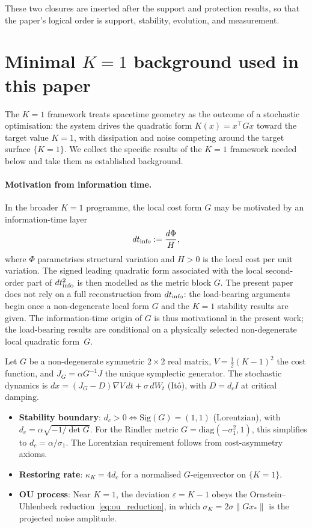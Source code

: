 \documentclass[11pt,a4paper]{article}
\theoremstyle{definition}
\begin{document}
\medskip\noindent
These two closures are inserted after the support and protection results,
so that the paper's logical order is support, stability, evolution, and
measurement.

\section{Minimal $K{=}1$ background used in this paper}\label{sec:review}

The $K{=}1$ framework treats spacetime geometry as the outcome of a stochastic optimisation: the system drives the quadratic form $K(x) = x^\top G x$ toward the target value $K = 1$, with dissipation and noise competing around the target surface $\{K{=}1\}$. We collect the specific results of the $K{=}1$ framework needed below and take them as established background.

\paragraph{Motivation from information time.}
In the broader $K{=}1$ programme, the local cost form $G$ may be
motivated by an information-time layer
\[
dt_{\rm info}:=\frac{d\Phi}{H},
\]
where $\Phi$ parametrises structural variation and $H>0$ is the
local cost per unit variation. The signed leading quadratic form
associated with the local second-order part of $dt_{\rm info}^2$ is
then modelled as the metric block $G$. The present paper does not rely
on a full reconstruction from $dt_{\rm info}$: the load-bearing
arguments begin once a non-degenerate local form $G$ and the
$K{=}1$ stability results are given. The information-time origin of $G$
is thus motivational in the present work; the load-bearing results are
conditional on a physically selected non-degenerate local quadratic
form~$G$.

Let $G$ be a non-degenerate symmetric $2\times 2$ real matrix, $V = \tfrac{1}{2}(K-1)^2$ the cost function, and $J_G = \alpha G^{-1}J$ the unique symplectic generator. The stochastic dynamics is $dx = (J_G - D)\nabla V\,dt + \sigma\,dW_t$ (It\^o), with $D = d_c I$ at critical damping.

\begin{itemize}
\item \textbf{Stability boundary}: $d_c > 0 \Leftrightarrow \mathrm{Sig}(G) = (1,1)$ (Lorentzian), with $d_c = \alpha\sqrt{-1/\det G}$. For the Rindler metric $G = \mathrm{diag}(-\sigma_1^2, 1)$, this simplifies to $d_c = \alpha/\sigma_1$. The Lorentzian requirement follows from cost-asymmetry axioms.
\item \textbf{Restoring rate}: $\kappa_K = 4d_c$ for a normalised $G$-eigenvector on $\{K{=}1\}$.
\item \textbf{OU process}: Near $K{=}1$, the deviation $\varepsilon = K - 1$ obeys the Ornstein--Uhlenbeck reduction~\eqref{eq:ou_reduction}, in which $\sigma_K = 2\sigma\|Gx_*\|$ is the projected noise amplitude.
\end{itemize}
\end{document}
